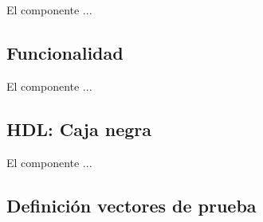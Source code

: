 \normalsize

	El componente ...
\subsection{Funcionalidad}
\scriptsize

\normalsize

	El componente ...
\subsection{HDL: Caja negra}
\scriptsize

\normalsize

	El componente ...
\subsection{Definición vectores de prueba}
\scriptsize

\normalsize

